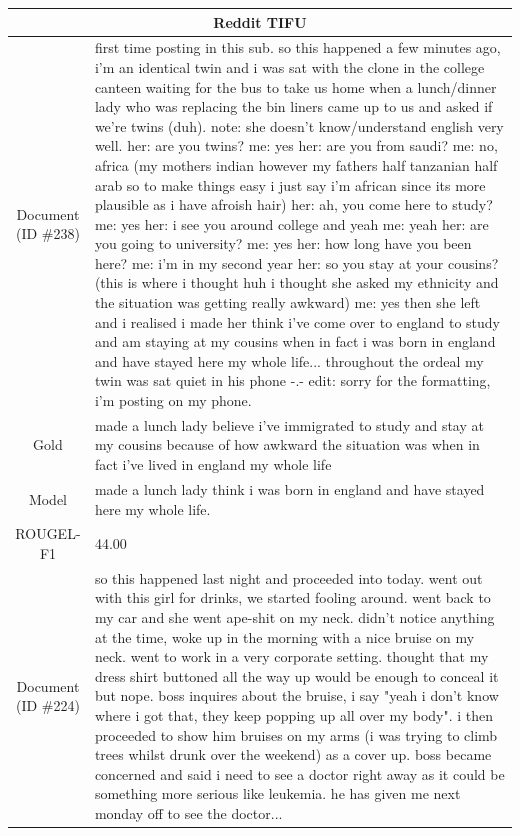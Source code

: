 \begin{table}[bth!]
\scriptsize
\centering
\renewcommand{\arraystretch}{1.3}
\begin{tabular}{c|p{}}
\hline
\multicolumn{2}{c}{Reddit TIFU} \\ \hline
\makecell{Document\\(ID \#238)} & 
first time posting in this sub. so this happened a few minutes ago, i'm an identical twin and i was sat with the clone in the college canteen waiting for the bus to take us home when a lunch/dinner lady who was replacing the bin liners came up to us and asked if we're twins (duh). note: she doesn't know/understand english very well. her: are you twins? me: yes her: are you from saudi? me: no, africa (my mothers indian however my fathers half tanzanian half arab so to make things easy i just say i'm african since its more plausible as i have afroish hair) her: ah, you come here to study? me: yes her: i see you around college and yeah me: yeah her: are you going to university? me: yes her: how long have you been here? me: i'm in my second year her: so you stay at your cousins? (this is where i thought huh i thought she asked my ethnicity and the situation was getting really awkward) me: yes then she left and i realised i made her think i've come over to england to study and am staying at my cousins when in fact i was born in england and have stayed here my whole life... throughout the ordeal my twin was sat quiet in his phone -.- edit: sorry for the formatting, i'm posting on my phone.
\\ \hline
Gold & 
made a lunch lady believe i've immigrated to study and stay at my cousins because of how awkward the situation was when in fact i've lived in england my whole life
\\ \hline
Model & 
made a lunch lady think i was born in england and have stayed here my whole life.
\\ \hline
ROUGEL-F1 & 
44.00
\\ \hline
\makecell{Document\\(ID \#224)} & 
so this happened last night and proceeded into today. went out with this girl for drinks, we started fooling around. went back to my car and she went ape-shit on my neck. didn't notice anything at the time, woke up in the morning with a nice bruise on my neck. went to work in a very corporate setting. thought that my dress shirt buttoned all the way up would be enough to conceal it but nope. boss inquires about the bruise, i say "yeah i don't know where i got that, they keep popping up all over my body". i then proceeded to show him bruises on my arms (i was trying to climb trees whilst drunk over the weekend) as a cover up. boss became concerned and said i need to see a doctor right away as it could be something more serious like leukemia. he has given me next monday off to see the doctor...

\end{tabular}
\end{table}
